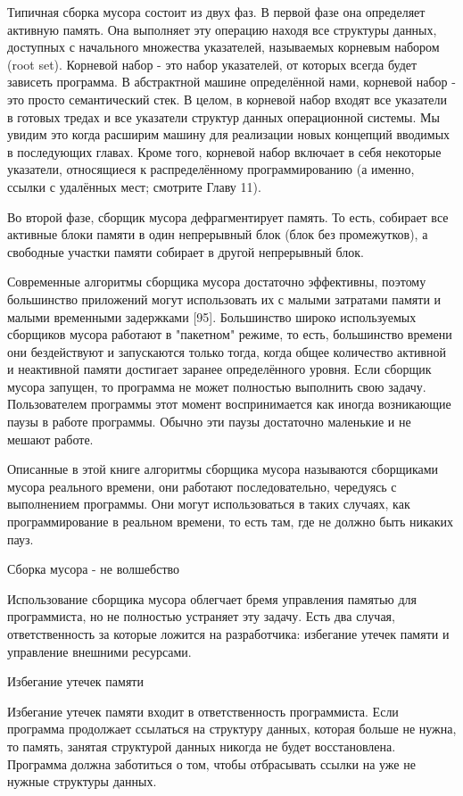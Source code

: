 Типичная сборка мусора состоит из двух фаз. В первой фазе она определяет активную память. Она выполняет эту операцию находя все структуры данных, доступных с начального множества указателей, называемых корневым набором (root set). Корневой набор - это набор указателей, от которых всегда будет зависеть программа. В абстрактной машине определённой нами, корневой набор - это просто семантический стек. В целом, в корневой набор входят все указатели в готовых тредах и все указатели структур данных операционной системы. Мы увидим это когда расширим машину для реализации новых концепций вводимых в последующих главах. Кроме того, корневой набор включает в себя некоторые указатели, относящиеся к распределённому программированию (а именно, ссылки с удалённых мест; смотрите Главу 11).

Во второй фазе, сборщик мусора дефрагментирует память. То есть, собирает все активные блоки памяти в один непрерывный блок (блок без промежутков), а свободные участки памяти собирает в другой непрерывный блок.

Современные алгоритмы сборщика мусора достаточно эффективны, поэтому большинство приложений могут использовать их с малыми затратами памяти и малыми временными задержками [95]. Большинство широко используемых сборщиков мусора работают в "пакетном" режиме, то есть, большинство времени они бездействуют и запускаются только тогда, когда общее количество активной и неактивной памяти достигает заранее определённого уровня. Если сборщик мусора запущен, то программа не может полностью выполнить свою задачу. Пользователем программы этот момент воспринимается как иногда возникающие паузы в работе программы. Обычно эти паузы достаточно маленькие и не мешают работе.

Описанные в этой книге алгоритмы сборщика мусора называются сборщиками мусора реального времени, они работают последовательно, чередуясь с выполнением программы. Они могут использоваться в таких случаях, как программирование в реальном времени, то есть там, где не должно быть никаких пауз.

Сборка мусора - не волшебство

Использование сборщика мусора облегчает бремя управления памятью для программиста, но не полностью устраняет эту задачу. Есть два случая, ответственность за которые ложится на разработчика: избегание утечек памяти и управление внешними ресурсами.

Избегание утечек памяти

Избегание утечек памяти входит в ответственность программиста. Если программа продолжает ссылаться на структуру данных, которая больше не нужна, то память, занятая структурой данных никогда не будет восстановлена. Программа должна заботиться о том, чтобы отбрасывать ссылки на уже не нужные структуры данных.

